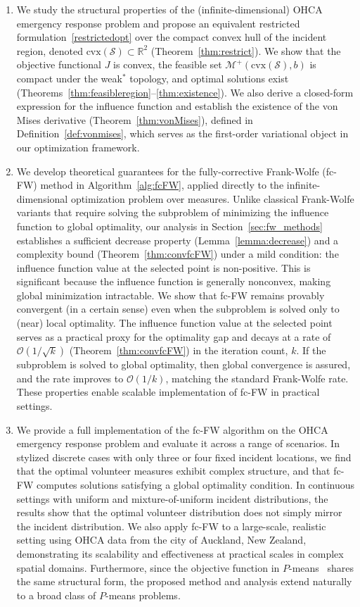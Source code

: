 \documentclass[stsy,sglanonrev]{informs4}
\begin{document}
\begin{enumerate}[label=(\alph*)]
    \item We study the structural properties of the (infinite-dimensional) OHCA emergency response problem and propose an equivalent restricted formulation~\eqref{restrictedopt} over the compact convex hull of the incident region, denoted $\mbox{cvx}(\mathcal{S}) \subset \mathbb{R}^2$ (Theorem~\ref{thm:restrict}). We show that the objective functional $J$ is convex, the feasible set $\mathcal{M}^+(\mbox{cvx}(\mathcal{S}), b)$ is compact under the weak$^*$ topology, and optimal solutions exist (Theorems~\ref{thm:feasibleregion}--\ref{thm:existence}). We also derive a closed-form expression for the influence function and establish the existence of the von Mises derivative (Theorem~\ref{thm:vonMises}), defined in Definition~\ref{def:vonmises}, which serves as the first-order variational object in our optimization framework.
    \item We develop theoretical guarantees for the fully-corrective Frank-Wolfe (fc-FW) method in Algorithm~\ref{alg:fcFW}, applied directly to the infinite-dimensional optimization problem over measures. Unlike classical Frank-Wolfe variants that require solving the subproblem of minimizing the influence function to global optimality, our analysis in Section~\ref{sec:fw_methods} establishes a sufficient decrease property (Lemma~\ref{lemma:decrease}) and a complexity bound (Theorem~\ref{thm:convfcFW}) under a mild condition: the influence function value at the selected point is non-positive. This is significant because the influence function is generally nonconvex, making global minimization intractable. We show that fc-FW remains provably convergent (in a certain sense) even when the subproblem is solved only to (near) local optimality. The influence function value at the selected point serves as a practical proxy for the optimality gap and decays at a rate of $\mathcal{O}(1/\sqrt{k})$ (Theorem~\ref{thm:convfcFW}) in the iteration count, $k$. If the subproblem is solved to global optimality, then global convergence is assured, and the rate improves to $\mathcal{O}(1/k)$, matching the standard Frank-Wolfe rate. These properties enable scalable implementation of fc-FW in practical settings.
    \item We provide a full implementation of the fc-FW algorithm on the OHCA emergency response problem and evaluate it across a range of scenarios. In stylized discrete cases with only three or four fixed incident locations, we find that the optimal volunteer measures exhibit complex structure, and that fc-FW computes solutions satisfying a global optimality condition. In continuous settings with uniform and mixture-of-uniform incident distributions, the results show that the optimal volunteer distribution does not simply mirror the incident distribution. We also apply fc-FW to a large-scale, realistic setting using OHCA data from the city of Auckland, New Zealand, demonstrating its scalability and effectiveness at practical scales in complex spatial domains. Furthermore, since the objective function in $P$-means~\cite{2002molzuy,2000oka} shares the same structural form, the proposed method and analysis extend naturally to a broad class of $P$-means problems.

\end{enumerate}
\end{document}
